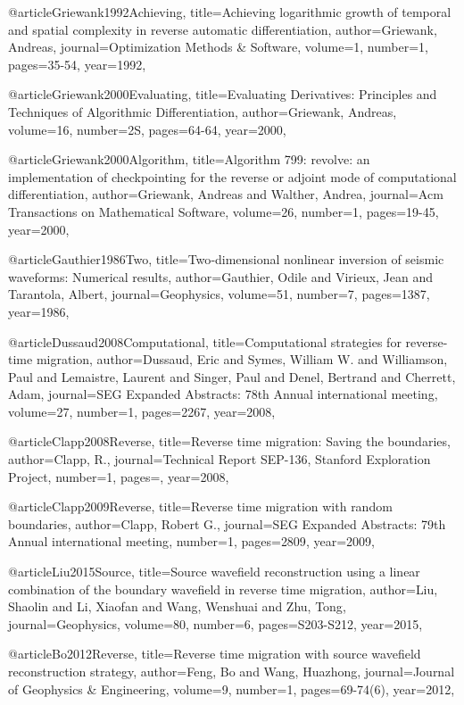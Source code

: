 @article{Griewank1992Achieving,
  title={Achieving logarithmic growth of temporal and spatial complexity in reverse automatic differentiation},
  author={Griewank, Andreas},
  journal={Optimization Methods \& Software},
  volume={1},
  number={1},
  pages={35-54},
  year={1992},
}

@article{Griewank2000Evaluating,
  title={Evaluating Derivatives: Principles and Techniques of Algorithmic Differentiation},
  author={Griewank, Andreas},
  volume={16},
  number={2S},
  pages={64-64},
  year={2000},
}

@article{Griewank2000Algorithm,
  title={Algorithm 799: revolve: an implementation of checkpointing for the reverse or adjoint mode of computational differentiation},
  author={Griewank, Andreas and Walther, Andrea},
  journal={Acm Transactions on Mathematical Software},
  volume={26},
  number={1},
  pages={19-45},
  year={2000},
}

@article{Gauthier1986Two,
  title={Two‐dimensional nonlinear inversion of seismic waveforms: Numerical results},
  author={Gauthier, Odile and Virieux, Jean and Tarantola, Albert},
  journal={Geophysics},
  volume={51},
  number={7},
  pages={1387},
  year={1986},
}

@article{Dussaud2008Computational,
  title={Computational strategies for reverse-time migration},
  author={Dussaud, Eric and Symes, William W. and Williamson, Paul and Lemaistre, Laurent and Singer, Paul and Denel, Bertrand and Cherrett, Adam},
  journal={SEG Expanded Abstracts: 78th Annual international meeting},
  volume={27},
  number={1},
  pages={2267},
  year={2008},
}

@article{Clapp2008Reverse,
  title={Reverse time migration: Saving the boundaries},
  author={Clapp, R.},
  journal={Technical Report SEP-136, Stanford Exploration Project},
  number={1},
  pages={},
  year={2008},
}

@article{Clapp2009Reverse,
  title={Reverse time migration with random boundaries},
  author={Clapp, Robert G.},
  journal={SEG Expanded Abstracts: 79th Annual international meeting},
  number={1},
  pages={2809},
  year={2009},
}

@article{Liu2015Source,
  title={Source wavefield reconstruction using a linear combination of the boundary wavefield in reverse time migration},
  author={Liu, Shaolin and Li, Xiaofan and Wang, Wenshuai and Zhu, Tong},
  journal={Geophysics},
  volume={80},
  number={6},
  pages={S203-S212},
  year={2015},
}

@article{Bo2012Reverse,
  title={Reverse time migration with source wavefield reconstruction strategy},
  author={Feng, Bo and Wang, Huazhong},
  journal={Journal of Geophysics \& Engineering},
  volume={9},
  number={1},
  pages={69-74(6)},
  year={2012},
}

